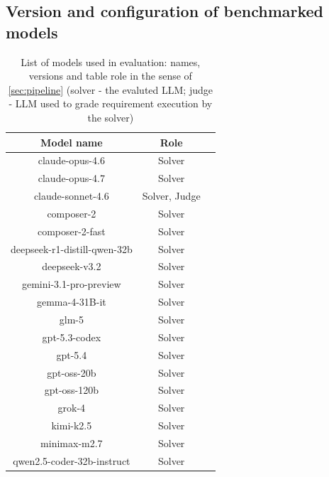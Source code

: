 \documentclass[11pt]{article}
\begin{document}
\subsection{Version and configuration of benchmarked models}

\begin{table}[h]
    \centering
    \begin{tabular}{c|c|c}
         \textbf{Model name} & \textbf{Role} \\
         \hline
         claude-opus-4.6 & Solver \\
         \hline
         claude-opus-4.7 & Solver \\
         \hline
         claude-sonnet-4.6 & Solver, Judge \\
         \hline
         composer-2 & Solver \\
         \hline
         composer-2-fast & Solver \\
         \hline
         deepseek-r1-distill-qwen-32b & Solver \\
         \hline
         deepseek-v3.2 & Solver \\
         \hline
         gemini-3.1-pro-preview & Solver \\
         \hline
         gemma-4-31B-it & Solver \\
         \hline
         glm-5 & Solver \\
         \hline
         gpt-5.3-codex & Solver \\
         \hline
         gpt-5.4 & Solver \\
         \hline
         gpt-oss-20b & Solver \\
         \hline
         gpt-oss-120b & Solver \\
         \hline
         grok-4 & Solver \\
         \hline
         kimi-k2.5 & Solver \\
         \hline
         minimax-m2.7 & Solver \\
         \hline
         qwen2.5-coder-32b-instruct & Solver \\
         \bottomrule
    \end{tabular}
    \caption{List of models used in evaluation: names, versions and table role in the sense of \cref{sec:pipeline} (solver - the evaluted LLM; judge - LLM used to grade requirement execution by the solver)}
    \label{tab:model-versions}
\end{table}
\end{document}
